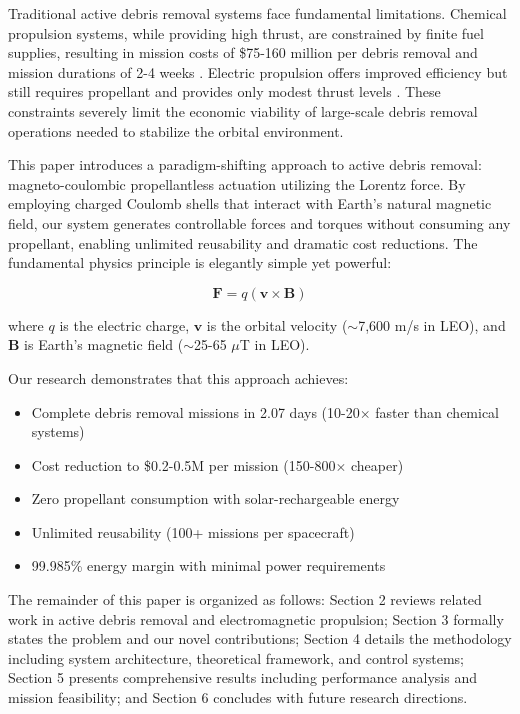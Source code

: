 \documentclass[12pt,a4paper]{article}
\begin{document}
Traditional active debris removal systems face fundamental limitations. Chemical propulsion systems, while providing high thrust, are constrained by finite fuel supplies, resulting in mission costs of \$75-160 million per debris removal and mission durations of 2-4 weeks \cite{bonnal2013active}. Electric propulsion offers improved efficiency but still requires propellant and provides only modest thrust levels \cite{mark2009commercial}. These constraints severely limit the economic viability of large-scale debris removal operations needed to stabilize the orbital environment.

This paper introduces a paradigm-shifting approach to active debris removal: magneto-coulombic propellantless actuation utilizing the Lorentz force. By employing charged Coulomb shells that interact with Earth's natural magnetic field, our system generates controllable forces and torques without consuming any propellant, enabling unlimited reusability and dramatic cost reductions. The fundamental physics principle is elegantly simple yet powerful:

\begin{equation}
\mathbf{F} = q(\mathbf{v} \times \mathbf{B})
\label{eq:lorentz}
\end{equation}

where $q$ is the electric charge, $\mathbf{v}$ is the orbital velocity ($\sim$7,600 m/s in LEO), and $\mathbf{B}$ is Earth's magnetic field ($\sim$25-65 $\mu$T in LEO).

Our research demonstrates that this approach achieves:
\begin{itemize}
\item Complete debris removal missions in 2.07 days (10-20$\times$ faster than chemical systems)
\item Cost reduction to \$0.2-0.5M per mission (150-800$\times$ cheaper)
\item Zero propellant consumption with solar-rechargeable energy
\item Unlimited reusability (100+ missions per spacecraft)
\item 99.985\% energy margin with minimal power requirements
\end{itemize}

The remainder of this paper is organized as follows: Section 2 reviews related work in active debris removal and electromagnetic propulsion; Section 3 formally states the problem and our novel contributions; Section 4 details the methodology including system architecture, theoretical framework, and control systems; Section 5 presents comprehensive results including performance analysis and mission feasibility; and Section 6 concludes with future research directions.
\end{document}
